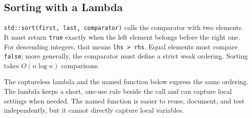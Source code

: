 \subsection{Sorting with a Lambda}

\texttt{std::sort(first, last, comparator)} calls the comparator with two elements.
It must return \texttt{true} exactly when the left element belongs before the right
one. For descending integers, that means \texttt{lhs > rhs}. Equal elements must
compare \texttt{false}; more generally, the comparator must define a strict weak
ordering. Sorting takes $O(n \log n)$ comparisons.

The captureless lambda and the named function below express the same ordering. The
lambda keeps a short, one-use rule beside the call and can capture local settings when
needed. The named function is easier to reuse, document, and test independently, but
it cannot directly capture local variables.

